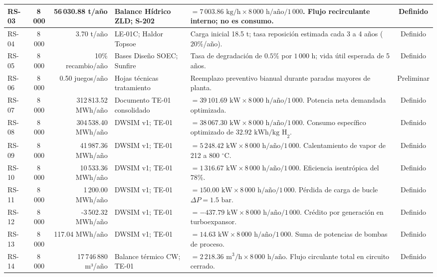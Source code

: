 \documentclass[10pt,letterpaper]{article}
\begin{document}
\begin{landscape}
\begin{xltabular}{\linewidth}{|l|c|r|p{3.5cm}|>{\raggedright\arraybackslash}X|c|}
RS-03 & 8\,000 & 56\,030.88 t/año & Balance Hídrico ZLD; S-202 & $= 7\,003.86\text{ kg/h} \times 8\,000\text{ h/año} / 1\,000$. Flujo recirculante interno; no es consumo. & Definido \\ \hline
RS-04 & 8\,000 & 3.70 t/año & LE-01C; Haldor Topsoe & Carga inicial 18.5 t; tasa reposición estimada cada 3 a 4 años ($20\%$/año). & Definido \\ \hline
RS-05 & 8\,000 & 10\% recambio/año & Bases Diseño SOEC; Sunfire & Tasa de degradación de $0.5\%$ por $1\,000\text{ h}$; vida útil esperada de 5 años. & Definido \\ \hline
RS-06 & 8\,000 & 0.50 juegos/año & Hojas técnicas tratamiento & Reemplazo preventivo bianual durante paradas mayores de planta. & Preliminar \\ \hline
RS-07 & 8\,000 & 312\,813.52 MWh/año & Documento TE-01 consolidado & $= 39\,101.69\text{ kW} \times 8\,000\text{ h/año} / 1\,000$. Potencia neta demandada optimizada. & Definido \\ \hline
RS-08 & 8\,000 & 304\,538.40 MWh/año & DWSIM v1; TE-01 & $= 38\,067.30\text{ kW} \times 8\,000\text{ h/año} / 1\,000$. Consumo específico optimizado de $32.92\text{ kWh/kg H}_2$. & Definido \\ \hline
RS-09 & 8\,000 & 41\,987.36 MWh/año & DWSIM v1; TE-01 & $= 5\,248.42\text{ kW} \times 8\,000\text{ h/año} / 1\,000$. Calentamiento de vapor de 212 a 800 $^\circ$C. & Definido \\ \hline
RS-10 & 8\,000 & 10\,533.36 MWh/año & DWSIM v1; TE-01 & $= 1\,316.67\text{ kW} \times 8\,000\text{ h/año} / 1\,000$. Eficiencia isentrópica del $78\%$. & Definido \\ \hline
RS-11 & 8\,000 & 1\,200.00 MWh/año & DWSIM v1; TE-01 & $= 150.00\text{ kW} \times 8\,000\text{ h/año} / 1\,000$. Pérdida de carga de bucle $\Delta P = 1.5\text{ bar}$. & Definido \\ \hline
RS-12 & 8\,000 & -3\,502.32 MWh/año & DWSIM v1; TE-01 & $= -437.79\text{ kW} \times 8\,000\text{ h/año} / 1\,000$. Crédito por generación en turboexpansor. & Definido \\ \hline
RS-13 & 8\,000 & 117.04 MWh/año & DWSIM v1; TE-01 & $= 14.63\text{ kW} \times 8\,000\text{ h/año} / 1\,000$. Suma de potencias de bombas de proceso. & Definido \\ \hline
RS-14 & 8\,000 & 17\,746\,880 m³/año & Balance térmico CW; TE-01 & $= 2\,218.36\text{ m}^3\text{/h} \times 8\,000\text{ h/año}$. Flujo circulante total en circuito cerrado. & Definido \\ \hline

\end{xltabular}
\end{landscape}
\end{document}

